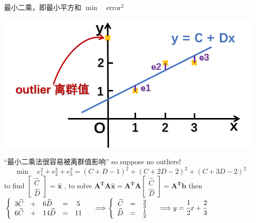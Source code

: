 \documentclass[12pt, a4paper]{article}
\begin{document}
{最小二乘，即最小平方和 \qquad $\min \quad {\text{error}}^2$
\begin{center}
	\includegraphics[scale=1.0]{figures/S16-3.png}
\end{center}
“最小二乘法很容易被离群值影响” so suppose no outliers!
\begin{displaymath}
	\min \quad e_1^2 + e_2^2 + e_3^2 = (C+D-1)^2 + (C+2D-2)^2 + (C+3D-2)^2
\end{displaymath}
to find 
\begin{math}
	\begin{bmatrix}
		\widehat{C} \\
		\widehat{D} 
	\end{bmatrix}
\end{math}
 = 
${\mathbf{\hat{x}}}$
, to solve 
\begin{math}
	{\mathbf{A^{T}}}{\mathbf{A}}{\mathbf{\hat{x}}} = 
	{\mathbf{A^{T}}}{\mathbf{A}}{
		\begin{bmatrix}
			\widehat{C} \\
			\widehat{D} 
		\end{bmatrix}
	} = 
	{\mathbf{A^{T}}}{\mathbf{b}}
\end{math}
\newline
then 
\begin{math}
	\left\{
	\begin{array}{rclrcl}
		3\widehat{C} & + & 6\widehat{D} & = & 5 \\
		6\widehat{C} & + & 14\widehat{D} & = & 11
	\end{array}
	\right.
	\quad 
	\Longrightarrow
	\left\{
	\begin{array}{rcl}
		\widehat{C} & = & \frac{2}{3} \\
		\widehat{D} & = & \frac{1}{2} 
	\end{array}
	\right.
	\quad 
	\Longrightarrow
	y=\cfrac{1}{2} x + \cfrac{2}{3}
\end{math}
}
\end{document}

